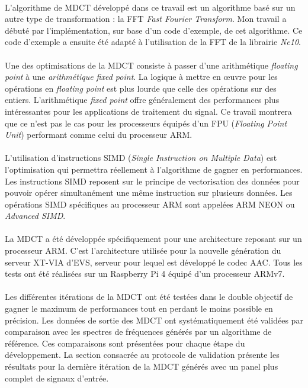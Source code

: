 \documentclass{article}
\begin{document}
    \paragraph{}
    L'algorithme de MDCT développé dans ce travail est un algorithme basé sur un autre type de transformation : la FFT \emph{Fast Fourier Transform}. Mon travail a débuté par l'implémentation, sur base d'un code d'exemple, de cet algorithme. Ce code d'exemple a ensuite été adapté à l'utilisation de la FFT de la librairie \emph{Ne10}.

    \paragraph{}
    Une des optimisations de la MDCT consiste à passer d'une arithmétique \emph{floating point} à une \emph{arithmétique fixed point}. La logique à mettre en \oe uvre pour les opérations en \emph{floating point} est plus lourde que celle des opérations sur des entiers. L'arithmétique \emph{fixed point} offre généralement des performances plus intéressantes pour les applications de traitement du signal. Ce travail montrera que ce n'est pas le cas pour les processeurs équipés d'un FPU (\emph{Floating Point Unit}) performant comme celui du processeur ARM.

    \paragraph{}
    L'utilisation d'instructions SIMD (\emph{Single Instruction on Multiple Data}) est l'optimisation qui permettra réellement à l'algorithme de gagner en performances. Les instructions SIMD reposent sur le principe de vectorisation des données pour pouvoir opérer simultanément une même instruction sur plusieurs données. Les opérations SIMD spécifiques au processeur ARM sont appelées ARM NEON ou \emph{Advanced SIMD}.

    \paragraph{}
    La MDCT a été développée spécifiquement pour une architecture reposant sur un processeur ARM. C'est l'architecture utilisée pour la nouvelle génération du serveur XT-VIA d'EVS, serveur pour lequel est développé le codec AAC. Tous les tests ont été réalisées sur un Raspberry Pi 4 équipé d'un processeur ARMv7.

    \paragraph{}
    Les différentes itérations de la MDCT ont été testées dans le double objectif de gagner le maximum de performances tout en perdant le moins possible en précision. Les données de sortie des MDCT ont systématiquement été validées par comparaison avec les spectres de fréquences générés par un algorithme de référence. Ces comparaisons sont présentées pour chaque étape du développement. La section consacrée au protocole de validation présente les résultats pour la dernière itération de la MDCT générés avec un panel plus complet de signaux d'entrée.
\end{document}
